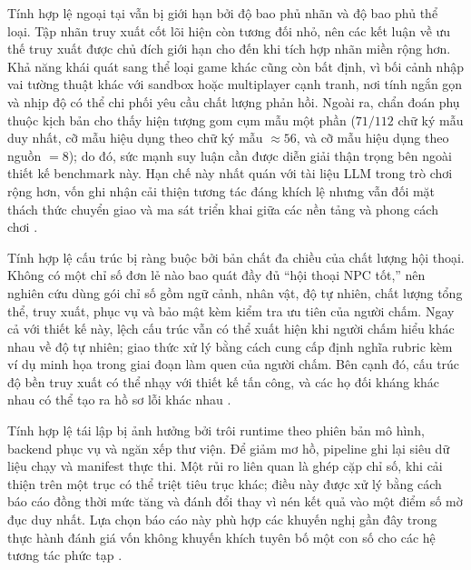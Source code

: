 ﻿\documentclass[a4paper,12pt]{article}
\begin{document}
Tính hợp lệ ngoại tại vẫn bị giới hạn bởi độ bao phủ nhãn và độ bao phủ thể loại. Tập nhãn truy xuất cốt lõi hiện còn tương đối nhỏ, nên các kết luận về ưu thế truy xuất được chủ đích giới hạn cho đến khi tích hợp nhãn miền rộng hơn. Khả năng khái quát sang thể loại game khác cũng còn bất định, vì bối cảnh nhập vai tường thuật khác với sandbox hoặc multiplayer cạnh tranh, nơi tính ngắn gọn và nhịp độ có thể chi phối yêu cầu chất lượng phản hồi. Ngoài ra, chẩn đoán phụ thuộc kịch bản cho thấy hiện tượng gom cụm mẫu một phần (\(71/112\) chữ ký mẫu duy nhất, cỡ mẫu hiệu dụng theo chữ ký mẫu \(\approx 56\), và cỡ mẫu hiệu dụng theo nguồn \(=8\)); do đó, sức mạnh suy luận cần được diễn giải thận trọng bên ngoài thiết kế benchmark này. Hạn chế này nhất quán với tài liệu LLM trong trò chơi rộng hơn, vốn ghi nhận cải thiện tương tác đáng khích lệ nhưng vẫn đối mặt thách thức chuyển giao và ma sát triển khai giữa các nền tảng và phong cách chơi \cite{Gallotta2024Survey,Sweetser2024Scoping,Rao2024Minecraft}.

Tính hợp lệ cấu trúc bị ràng buộc bởi bản chất đa chiều của chất lượng hội thoại. Không có một chỉ số đơn lẻ nào bao quát đầy đủ ``hội thoại NPC tốt,'' nên nghiên cứu dùng gói chỉ số gồm ngữ cảnh, nhân vật, độ tự nhiên, chất lượng tổng thể, truy xuất, phục vụ và bảo mật kèm kiểm tra ưu tiên của người chấm. Ngay cả với thiết kế này, lệch cấu trúc vẫn có thể xuất hiện khi người chấm hiểu khác nhau về độ tự nhiên; giao thức xử lý bằng cách cung cấp định nghĩa rubric kèm ví dụ minh họa trong giai đoạn làm quen của người chấm. Bên cạnh đó, cấu trúc độ bền truy xuất có thể nhạy với thiết kế tấn công, và các họ đối kháng khác nhau có thể tạo ra hồ sơ lỗi khác nhau \cite{Zou2025PoisonedRAG,Chaturvedi2025AIP}.

Tính hợp lệ tái lập bị ảnh hưởng bởi trôi runtime theo phiên bản mô hình, backend phục vụ và ngăn xếp thư viện. Để giảm mơ hồ, pipeline ghi lại siêu dữ liệu chạy và manifest thực thi. Một rủi ro liên quan là ghép cặp chỉ số, khi cải thiện trên một trục có thể triệt tiêu trục khác; điều này được xử lý bằng cách báo cáo đồng thời mức tăng và đánh đổi thay vì nén kết quả vào một điểm số mờ đục duy nhất. Lựa chọn báo cáo này phù hợp các khuyến nghị gần đây trong thực hành đánh giá vốn không khuyến khích tuyên bố một con số cho các hệ tương tác phức tạp \cite{Liang2023HELM,Wang2024Judge,Dubois2024AlpacaEval}.
\end{document}
